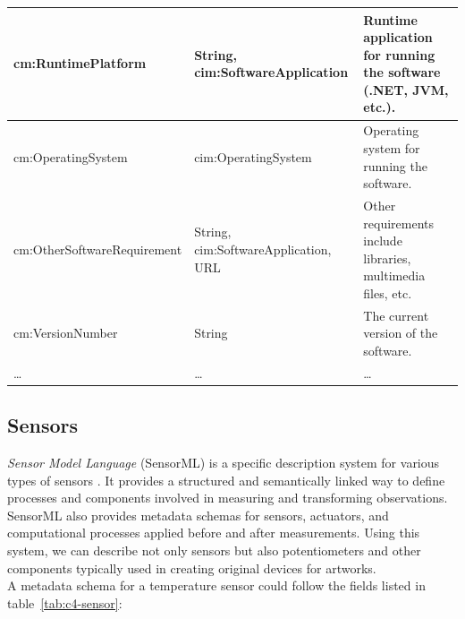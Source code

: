 \begin{longtable}{|p{}|p{}|p{}|}
    \hline
    \scriptsize cm:RuntimePlatform                    & \scriptsize String, \textcolor{uniudColor3}{cim:SoftwareApplication} & \scriptsize Runtime application for running the software (.NET, JVM, etc.). \\
    \hline
    \scriptsize cm:OperatingSystem                    & \scriptsize \textcolor{uniudColor3}{cim:OperatingSystem}            & \scriptsize Operating system for running the software. \\
    \hline
    \scriptsize cm:OtherSoftwareRequirement           & \scriptsize String, \textcolor{uniudColor3}{cim:SoftwareApplication}, URL & \scriptsize Other requirements include libraries, multimedia files, etc. \\
    \hline
    \scriptsize cm:VersionNumber                      & \scriptsize String                         & \scriptsize The current version of the software. \\
    \hline
    \scriptsize …                                     & \scriptsize …                              & \scriptsize … \\
    \hline

\end{longtable}

\subsection{Sensors}
\textit{Sensor Model Language} (SensorML) is a specific description system for various types of sensors \cite{SensorML}. It provides a structured and semantically linked way to define processes and components involved in measuring and transforming observations. SensorML also provides metadata schemas for sensors, actuators, and computational processes applied before and after measurements. Using this system, we can describe not only sensors but also potentiometers and other components typically used in creating original devices for artworks.\\
A metadata schema for a temperature sensor could follow the fields listed in table~\ref{tab:c4-sensor}:


